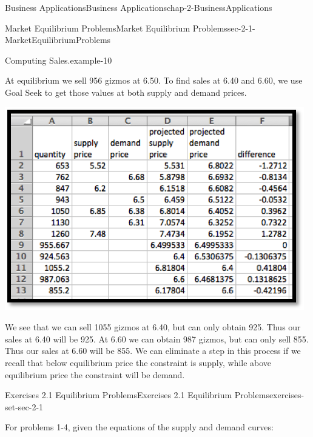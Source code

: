 \documentclass[oneside,10pt,]{book}
\numberwithin{equation}{section}
\begin{document}
\begin{chapterptx}{Business Applications}{}{Business Applications}{}{}{chap-2-BusinessApplications}
\begin{sectionptx}{Market Equilibrium Problems}{}{Market Equilibrium Problems}{}{}{sec-2-1-MarketEquilibriumProblems}
\begin{example}{Computing Sales.}{example-10}
%
\par
\hypertarget{p-583}{}%
At equilibrium we sell 956 gizmos at \textdollar{}6.50.  To find sales at \textdollar{}6.40 and \textdollar{}6.60, we use Goal Seek to get those values at both supply and demand prices. \leavevmode%
\begin{sidebyside}{1}{0.25}{0.25}{0}%
\begin{sbspanel}{0.5}%
\includegraphics[width=1\linewidth]{images/sec2-1-11.png}
\end{sbspanel}%
\end{sidebyside}%
%
\par
\hypertarget{p-584}{}%
We see that we can sell 1055 gizmos at \textdollar{}6.40, but can only obtain 925.  Thus our sales at \textdollar{}6.40 will be 925.  At \textdollar{}6.60 we can obtain 987 gizmos, but can only sell 855.  Thus our sales at \textdollar{}6.60 will be 855.  We can eliminate a step in this process if we recall that below equilibrium price the constraint is supply, while above equilibrium price the constraint will be demand.%
\end{example}
%
%
\typeout{************************************************}
\typeout{************************************************}
%
\begin{exercises-subsection-numberless}{Exercises 2.1 Equilibrium Problems}{}{Exercises 2.1 Equilibrium Problems}{}{}{exercises-set-sec-2-1}
\par\medskip\noindent%
\hypertarget{exercisegroup-4}{}%
\hypertarget{p-585}{}%
For problems 1-4, given the equations of the supply and demand curves:%
\leavevmode%
\begin{enumerate}[label=(\alph*)]

\end{enumerate}
\end{exercises-subsection-numberless}
\end{sectionptx}
\end{chapterptx}
\end{document}
